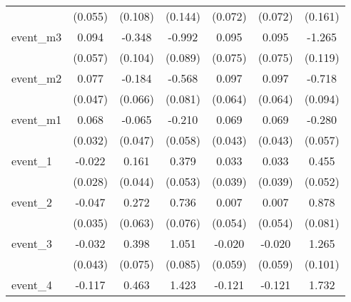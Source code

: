 {\begin{tabular}{l*{6}{c}}
            &     (0.055)         &     (0.108)         &     (0.144)         &     (0.072)         &     (0.072)         &     (0.161)         \\
[1em]
event\_m3    &       0.094         &      -0.348\sym{***}&      -0.992\sym{***}&       0.095         &       0.095         &      -1.265\sym{***}\\
            &     (0.057)         &     (0.104)         &     (0.089)         &     (0.075)         &     (0.075)         &     (0.119)         \\
[1em]
event\_m2    &       0.077         &      -0.184\sym{**} &      -0.568\sym{***}&       0.097         &       0.097         &      -0.718\sym{***}\\
            &     (0.047)         &     (0.066)         &     (0.081)         &     (0.064)         &     (0.064)         &     (0.094)         \\
[1em]
event\_m1    &       0.068\sym{*}  &      -0.065         &      -0.210\sym{***}&       0.069         &       0.069         &      -0.280\sym{***}\\
            &     (0.032)         &     (0.047)         &     (0.058)         &     (0.043)         &     (0.043)         &     (0.057)         \\
[1em]
event\_1     &      -0.022         &       0.161\sym{***}&       0.379\sym{***}&       0.033         &       0.033         &       0.455\sym{***}\\
            &     (0.028)         &     (0.044)         &     (0.053)         &     (0.039)         &     (0.039)         &     (0.052)         \\
[1em]
event\_2     &      -0.047         &       0.272\sym{***}&       0.736\sym{***}&       0.007         &       0.007         &       0.878\sym{***}\\
            &     (0.035)         &     (0.063)         &     (0.076)         &     (0.054)         &     (0.054)         &     (0.081)         \\
[1em]
event\_3     &      -0.032         &       0.398\sym{***}&       1.051\sym{***}&      -0.020         &      -0.020         &       1.265\sym{***}\\
            &     (0.043)         &     (0.075)         &     (0.085)         &     (0.059)         &     (0.059)         &     (0.101)         \\
[1em]
event\_4     &      -0.117         &       0.463\sym{***}&       1.423\sym{***}&      -0.121         &      -0.121         &       1.732\sym{***}\\

\end{tabular}}
